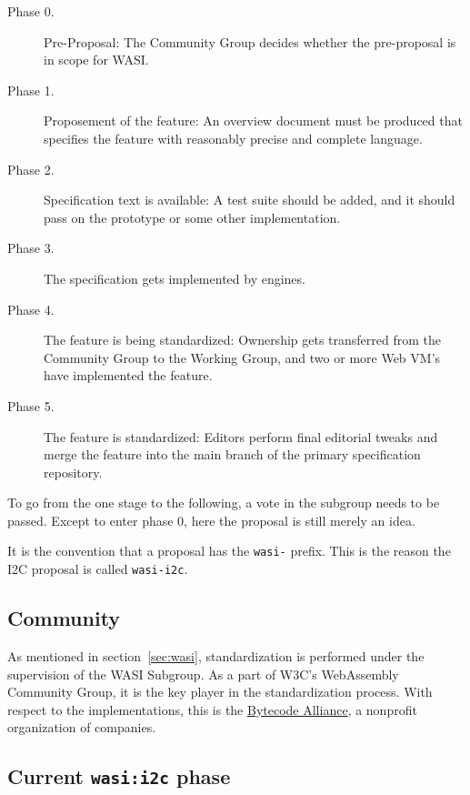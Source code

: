 \begin{description}
    \item[Phase 0.] Pre-Proposal: The Community Group decides whether the pre-proposal is in scope for \gls{WASI}.
    \item[Phase 1.] Proposement of the feature: An overview document must be produced that specifies the feature with reasonably precise and complete language.
    \item[Phase 2.] Specification text is available: A test suite should be added, and it should pass on the prototype or some other implementation.
    \item[Phase 3.] The specification gets implemented by engines.
    \item[Phase 4.] The feature is being standardized: Ownership gets transferred from the Community Group to the Working Group, and two or more Web \gls{VM}'s have implemented the feature.
    \item[Phase 5.] The feature is standardized: Editors perform final editorial tweaks and merge the feature into the main branch of the primary specification repository.

\end{description}

To go from the one stage to the following, a vote in the subgroup needs to be passed. Except to enter phase 0, here the proposal is still merely an idea.

It is the convention that a proposal has the \texttt{wasi-} prefix. This is the reason the \gls{I2C} proposal is called \texttt{wasi-i2c}.

\subsection{Community}
\label{sec:community}

As mentioned in section~\ref{sec:wasi}, standardization is performed under the supervision of the \gls{WASI} Subgroup. As a part of W3C's WebAssembly Community Group, it is the key player in the standardization process. With respect to the implementations, this is the \href{https://bytecodealliance.org/}{Bytecode Alliance}, a nonprofit organization of companies.

\subsection{Current \texttt{wasi:i2c} phase}


